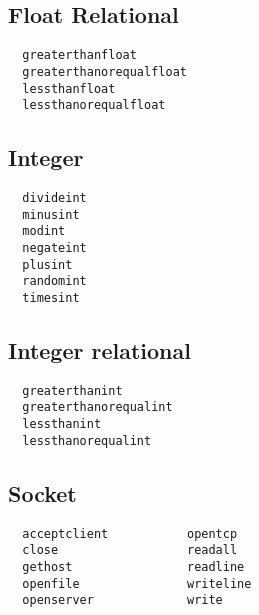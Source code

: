 \documentclass{article}
\begin{document}
\subsection{Float Relational}
\begin{verbatim}
  greaterthanfloat
  greaterthanorequalfloat
  lessthanfloat
  lessthanorequalfloat
\end{verbatim}

\subsection{Integer}
\begin{verbatim}
  divideint
  minusint
  modint
  negateint
  plusint
  randomint
  timesint
\end{verbatim}

\subsection{Integer relational}
\begin{verbatim}
  greaterthanint
  greaterthanorequalint
  lessthanint
  lessthanorequalint
\end{verbatim}

\subsection{Socket}
\begin{verbatim}
  acceptclient           opentcp         
  close                  readall           
  gethost                readline          
  openfile               writeline         
  openserver             write           
\end{verbatim}


\begin{thebibliography}{5}
\end{thebibliography}
\end{document}
